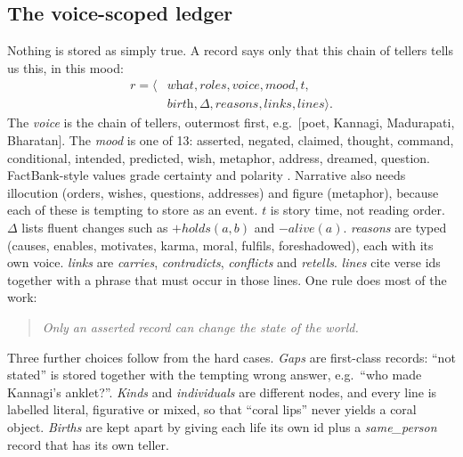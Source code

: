 \documentclass[11pt]{article}
\newcommand{\mood}[1]{\textsf{\small #1}}
\begin{document}
\subsection{The voice-scoped ledger}
Nothing is stored as simply true. A record says only that this chain of tellers tells us this, in this mood:
\begin{equation}
\begin{split}
r=\langle &\textit{what},\textit{roles},\textit{voice},\textit{mood},t,\\
&\textit{birth},\Delta,\textit{reasons},\textit{links},\textit{lines}\rangle .
\end{split}
\end{equation}
The \textit{voice} is the chain of tellers, outermost first, e.g.\ [poet, Kannagi, Madurapati, Bharatan]. The \textit{mood} is one of 13: \mood{asserted, negated, claimed, thought, command, conditional, intended, predicted, wish, metaphor, address, dreamed, question}. FactBank-style values grade certainty and polarity \citep{Sauri2009Factbank}. Narrative also needs illocution (orders, wishes, questions, addresses) and figure (metaphor), because each of these is tempting to store as an event. $t$ is story time, not reading order. $\Delta$ lists fluent changes such as $+\mathit{holds}(a,b)$ and $-\mathit{alive}(a)$. \textit{reasons} are typed (causes, enables, motivates, karma, moral, fulfils, foreshadowed), each with its own voice. \textit{links} are \emph{carries}, \emph{contradicts}, \emph{conflicts} and \emph{retells}. \textit{lines} cite verse ids together with a phrase that must occur in those lines. One rule does most of the work:
\begin{quote}\emph{Only an \mood{asserted} record can change the state of the world.}\end{quote}
Three further choices follow from the hard cases. \emph{Gaps} are first-class records: ``not stated'' is stored together with the tempting wrong answer, e.g.\ ``who made Kannagi's anklet?''. \emph{Kinds} and \emph{individuals} are different nodes, and every line is labelled literal, figurative or mixed, so that ``coral lips'' never yields a coral object. \emph{Births} are kept apart by giving each life its own id plus a \emph{same\_person} record that has its own teller.
\end{document}
